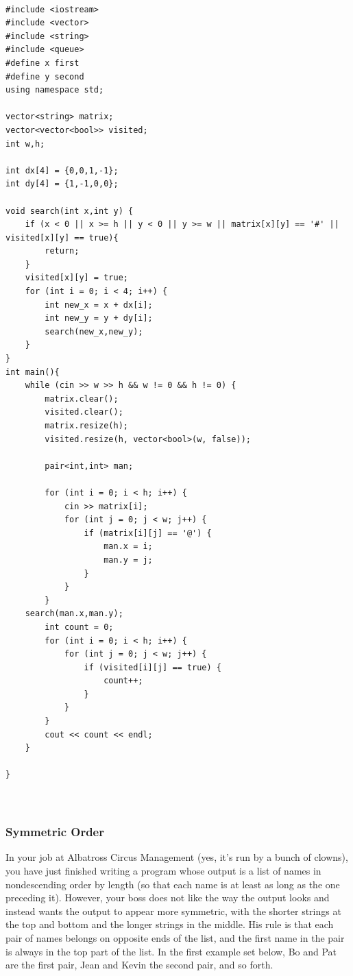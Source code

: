\documentclass{article}
\begin{document}
\begin{lstlisting}

#include <iostream>
#include <vector>
#include <string>
#include <queue>
#define x first
#define y second
using namespace std;

vector<string> matrix;
vector<vector<bool>> visited;
int w,h;

int dx[4] = {0,0,1,-1};
int dy[4] = {1,-1,0,0};

void search(int x,int y) {
    if (x < 0 || x >= h || y < 0 || y >= w || matrix[x][y] == '#' || visited[x][y] == true){
        return;
    }
    visited[x][y] = true;
    for (int i = 0; i < 4; i++) {
        int new_x = x + dx[i];
        int new_y = y + dy[i];
        search(new_x,new_y);
    }
}
int main(){
    while (cin >> w >> h && w != 0 && h != 0) {
        matrix.clear();
        visited.clear();
        matrix.resize(h);
        visited.resize(h, vector<bool>(w, false));

        pair<int,int> man;

        for (int i = 0; i < h; i++) {
            cin >> matrix[i];
            for (int j = 0; j < w; j++) {
                if (matrix[i][j] == '@') {
                    man.x = i;
                    man.y = j;
                }
            }
        }
    search(man.x,man.y);
        int count = 0;
        for (int i = 0; i < h; i++) {
            for (int j = 0; j < w; j++) {
                if (visited[i][j] == true) {
                    count++;
                }
            }
        }
        cout << count << endl;
    }

}

	
\end{lstlisting}

\subsubsection{Symmetric Order}
 
In your job at Albatross Circus Management (yes, it’s run by a bunch of clowns), you have just
finished writing a program whose output is a list of names in nondescending order by length (so
that each name is at least as long as the one preceding it). However, your boss does not like the
way the output looks and instead wants the output to appear more symmetric, with the shorter
strings at the top and bottom and the longer strings in the middle. His rule is that each pair of
names belongs on opposite ends of the list, and the first name in the pair is always in the top part
of the list. In the first example set below, Bo and Pat are the first pair, Jean and Kevin the second
pair, and so forth.
\end{document}
